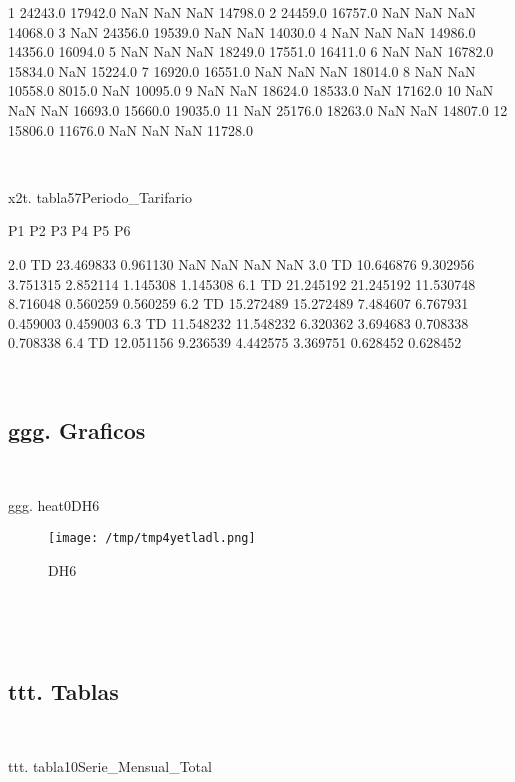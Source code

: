 \documentclass[a4paper,10pt]{article}
\begin{document}
\begin{Form}
1     24243.0  17942.0      NaN      NaN      NaN  14798.0
2     24459.0  16757.0      NaN      NaN      NaN  14068.0
3         NaN  24356.0  19539.0      NaN      NaN  14030.0
4         NaN      NaN      NaN  14986.0  14356.0  16094.0
5         NaN      NaN      NaN  18249.0  17551.0  16411.0
6         NaN      NaN  16782.0  15834.0      NaN  15224.0
7     16920.0  16551.0      NaN      NaN      NaN  18014.0
8         NaN      NaN  10558.0   8015.0      NaN  10095.0
9         NaN      NaN  18624.0  18533.0      NaN  17162.0
10        NaN      NaN      NaN  16693.0  15660.0  19035.0
11        NaN  25176.0  18263.0      NaN      NaN  14807.0
12    15806.0  11676.0      NaN      NaN      NaN  11728.0 \

\

x2t. tabla57Periodo_Tarifario

               P1         P2         P3        P4        P5        P6
                                                                     
2.0 TD  23.469833   0.961130        NaN       NaN       NaN       NaN
3.0 TD  10.646876   9.302956   3.751315  2.852114  1.145308  1.145308
6.1 TD  21.245192  21.245192  11.530748  8.716048  0.560259  0.560259
6.2 TD  15.272489  15.272489   7.484607  6.767931  0.459003  0.459003
6.3 TD  11.548232  11.548232   6.320362  3.694683  0.708338  0.708338
6.4 TD  12.051156   9.236539   4.442575  3.369751  0.628452  0.628452 \

\
\newpage 
\subsection{ggg. Graficos}\

ggg. heat0DH6

\begin{figure}[H] \centering
                    
                    \texttt{[image: /tmp/tmp4yetladl.png]}
                    \caption{DH6}
                    
                    \label{fig:dfassssdfsa}
                    \end{figure}
                     \

\
\newpage 
\subsection{ttt. Tablas}\

ttt. tabla10Serie_Mensual_Total



\end{Form}
\end{document}

